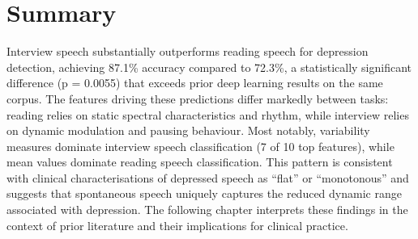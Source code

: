 \section{Summary}

Interview speech substantially outperforms reading speech for depression detection, achieving 87.1\% accuracy compared to 72.3\%, a statistically significant difference (p = 0.0055) that exceeds prior deep learning results on the same corpus. The features driving these predictions differ markedly between tasks: reading relies on static spectral characteristics and rhythm, while interview relies on dynamic modulation and pausing behaviour. Most notably, variability measures dominate interview speech classification (7 of 10 top features), while mean values dominate reading speech classification. This pattern is consistent with clinical characterisations of depressed speech as ``flat'' or ``monotonous'' and suggests that spontaneous speech uniquely captures the reduced dynamic range associated with depression. The following chapter interprets these findings in the context of prior literature and their implications for clinical practice.
